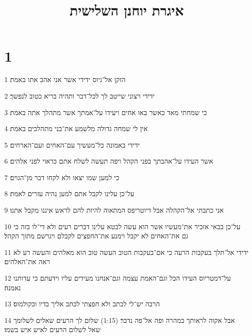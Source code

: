 

\title{איגרת יוחנן השלישית}


\chapter{1}

\par 1 הזקן אל־גיוס ידידי אשר אני אהב אתו באמת׃
\par 2 ידידי רצוני שייטב לך לכל־דבר ותהיה בריא כטוב לנפשך׃
\par 3 כי שמחתי מאד כאשר באו אחים ויעידו על־אמתך אשר מתהלך אתה באמת׃
\par 4 אין לי שמחה גדולה מלשמע את־בני מתהלכים באמת׃
\par 5 ידידי באמונה כל־מעשיך עם־האחים ועם־הארחים׃
\par 6 אשר העידו על־אהבתך בפני הקהל ויפה תעשה לשלח אתם כראוי לפני אלהים׃
\par 7 כי למען שמו יצאו ולא לקחו דבר מן־הגוים׃
\par 8 על־כן עלינו לקבל אתם למען נהיה עזרים לאמת׃
\par 9 אני כתבתי אל־הקהלה אבל דיוטריפס המתאוה להיות להם לראש איננו מקבל אתנו׃
\par 10 על־כן בבאי אזכיר את־מעשיו אשר הוא עשה לבטא עלינו דברים רעים ולא די־לו בזה כי גם את־האחים לא יקבל וימנע את־החפצים לקבלם ויגרשם מתוך הקהל׃
\par 11 ידידי אל־תלך בעקבות הרעה כי אם־בעקבות הטוב העשה טוב הוא מאלהים והעשה רע לא ראה את־האלהים׃
\par 12 על־דמטריוס העידו הכל וגם־האמת עצמה וגם־אנחנו מעידים עליו וידעתם כי עדותנו נאמנה׃
\par 13 הרבה יש־לי לכתב ולא חפצתי לכתב אליך בדיו ובקולמוס׃
\par 14 אבל אקוה לראותך במהרה ופה אל־פה נדבר׃ (1:15) שלום לך הרעים שאלים לשלומך שאל לשלום הרעים לאיש איש בשמו׃


